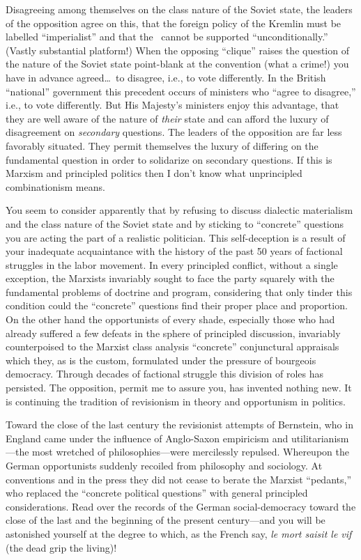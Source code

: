 Disagreeing among themselves on the class nature of the Soviet state, the leaders of the opposition agree on this, that the foreign policy of the Kremlin must be labelled “imperialist” and that the \USSR\ cannot be supported “unconditionally.” (Vastly substantial platform!) When the opposing “clique” raises the question of the nature of the Soviet state point-blank at the convention (what a crime!) you have in advance agreed\dots\ to disagree, i.e., to vote differently. In the British “national” government this precedent occurs of ministers who “agree to disagree,” i.e., to vote differently. But His Majesty’s ministers enjoy this advantage, that they are well aware of the nature of \emph{their} state and can afford the luxury of disagreement on \emph{secondary} questions. The leaders of the opposition are far less favorably situated. They permit themselves the luxury of differing on the fundamental question in order to solidarize on secondary questions. If this is Marxism and principled politics then I don’t know what unprincipled combinationism means.

You seem to consider apparently that by refusing to discuss dialectic materialism and the class nature of the Soviet state and by sticking to “concrete” questions you are acting the part of a realistic politician. This self-deception is a result of your inadequate acquaintance with the history of the past 50 years of factional struggles in the labor movement. In every principled conflict, without a single exception, the Marxists invariably sought to face the party squarely with the fundamental problems of doctrine and program, considering that only tinder this condition could the “concrete” questions find their proper place and proportion. On the other hand the opportunists of every shade, especially those who had already suffered a few defeats in the sphere of principled discussion, invariably counterpoised to the Marxist class analysis “concrete” conjunctural appraisals which they, as is the custom, formulated under the pressure of bourgeois democracy. Through decades of factional struggle this division of roles has persisted. The opposition, permit me to assure you, has invented nothing new. It is continuing the tradition of revisionism in theory and opportunism in politics.

Toward the close of the last century the revisionist attempts of Bernstein, who in England came under the influence of Anglo-Saxon empiricism and utilitarianism---the most wretched of philosophies---were mercilessly repulsed. Whereupon the German opportunists suddenly recoiled from philosophy and sociology. At conventions and in the press they did not cease to berate the Marxist “pedants,” who replaced the “concrete political questions” with general principled considerations. Read over the records of the German social-democracy toward the close of the last and the beginning of the present century---and you will be astonished yourself at the degree to which, as the French say, \emph{le mort saisit le vif} (the dead grip the living)!

